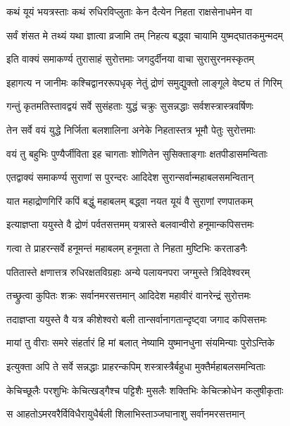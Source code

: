 \twolineshloka
{कथं यूयं भयत्रस्ताः कथं रुधिरविप्लुताः}
{केन दैत्येन निहता राक्षसेनाधमेन वा}%

\twolineshloka
{सर्वं शंसत मे तथ्यं यथा ज्ञात्वा व्रजामि तम्}
{निहत्य बद्ध्वा चायामि युष्मद्घातकमुन्मदम्}%

\twolineshloka
{इति वाक्यं समाकर्ण्य तुरासाहं सुरोत्तमाः}
{जगदुर्दीनया वाचा सुरासुरनमस्कृतम्}%


\twolineshloka
{इहागत्य न जानीमः कश्चिद्वानररूपधृक्}
{नेतुं द्रोणं समुद्युक्तो लाङ्गूले वेष्ट्य तं गिरिम्}%

\twolineshloka
{गन्तुं कृतमतिस्तावद्वयं सर्वे सुसंहताः}
{युद्धं चक्रुः सुसन्नद्धाः सर्वशस्त्रास्त्रवर्षिणः}%

\twolineshloka
{तेन सर्वे वयं युद्धे निर्जिता बलशालिना}
{अनेके निहतास्तत्र भूमौ पेतुः सुरोत्तमाः}%

\twolineshloka
{वयं तु बहुभिः पुण्यैर्जीविता इह चागताः}
{शोणितेन सुसिक्ताङ्गाः क्षतपीडासमन्विताः}%

\twolineshloka
{एतद्वाक्यं समाकर्ण्य सुराणां स पुरन्दरः}
{आदिदेश सुरान्सर्वान्महाबलसमन्वितान्}%

\twolineshloka
{यात महाद्रोणगिरिं कपिं बद्धुं महाबलम्}
{बद्ध्वा नयत यूयं वै सुराणां रणपातकम्}%

\twolineshloka
{इत्याज्ञप्ता ययुस्ते वै द्रोणं पर्वतसत्तमम्}
{यत्रास्ते बलवान्वीरो हनूमान्कपिसत्तमः}%

\twolineshloka
{गत्वा ते प्राहरन्सर्वे हनूमन्तं महाबलम्}
{हनूमता ते निहता मुष्टिभिः करताडनैः}%

\twolineshloka
{पतितास्ते क्षणात्तत्र रुधिरक्षतविग्रहाः}
{अन्ये पलायनपरा जग्मुस्ते त्रिदिवेश्वरम्}%

\twolineshloka
{तच्छ्रुत्वा कुपितः शक्रः सर्वानमरसत्तमान्}
{आदिदेश महावीरं वानरेन्द्रं सुरोत्तमः}%

\twolineshloka
{तदाज्ञप्ता ययुस्ते वै यत्र कीशेश्वरो बली}
{तान्सर्वानागतान्दृष्ट्वा जगाद कपिसत्तमः}%

\twolineshloka
{मायां तु वीराः समरे संहर्तारं हि मां बलात्}
{नेष्यामि युष्मानधुना संयमिन्याः पुरोऽन्तिके}%

\twolineshloka
{इत्युक्ता अपि ते सर्वे सन्नद्धाः प्राहरन्कपिम्}
{शस्त्रास्त्रैर्बहुधा मुक्तैर्महाबलसमन्विताः}%

\twolineshloka
{केचिच्छूलैः परशुभिः केचित्खड्गैश्च पट्टिशैः}
{मुसलैः शक्तिभिः केचित्क्रोधेन कलुषीकृताः}%

\twolineshloka
{स आहतोऽमरवरैर्विविधैरायुधैर्बली}
{शिलाभिस्ताञ्जघानाशु सर्वानमरसत्तमान्}%

